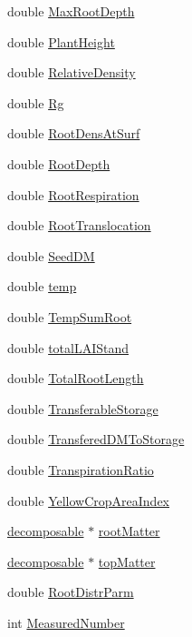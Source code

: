 \begin{DoxyCompactItemize}
double \hyperlink{classcrop_a10ecc3d91cd9e62af94a5b889587d3f4}{MaxRootDepth}
\item 
double \hyperlink{classcrop_a3f40980535ac184d9cced18aff1a0f8c}{PlantHeight}
\item 
double \hyperlink{classcrop_aa4666fdd11920e05003bfeefc5518ddf}{RelativeDensity}
\item 
double \hyperlink{classcrop_a089361fdbd7eedb3b84e501ebc4f7221}{Rg}
\item 
double \hyperlink{classcrop_a512f2450d70fb9f2a84d046d5a090a94}{RootDensAtSurf}
\item 
double \hyperlink{classcrop_aefe9049cee98b6ac81f4362c4a1190a9}{RootDepth}
\item 
double \hyperlink{classcrop_ab27528bd7fd066f3c4e028de1fbc70e1}{RootRespiration}
\item 
double \hyperlink{classcrop_a15b020b5308e854371c7919b1ebe64ab}{RootTranslocation}
\item 
double \hyperlink{classcrop_a2dfb21c27aff36f3049be9a39e7c6538}{SeedDM}
\item 
double \hyperlink{classcrop_abfc8df1469f20d8084f744da461d1df5}{temp}
\item 
double \hyperlink{classcrop_a362d42d586668dca552ec4d8cd381b68}{TempSumRoot}
\item 
double \hyperlink{classcrop_ac25231ecf44f1c5ffb8bf60c45334929}{totalLAIStand}
\item 
double \hyperlink{classcrop_a1f0aa4443cf11cdf5776454bd056fa28}{TotalRootLength}
\item 
double \hyperlink{classcrop_a0c55583d4613cc09bb912de3078aae49}{TransferableStorage}
\item 
double \hyperlink{classcrop_ab1133e34965bc17531d6bbf675cfa240}{TransferedDMToStorage}
\item 
double \hyperlink{classcrop_a461228045f8a07f1f12a06acd12adf89}{TranspirationRatio}
\item 
double \hyperlink{classcrop_a7acb3fa412808c819f4d9b662cc2148c}{YellowCropAreaIndex}
\item 
\hyperlink{classdecomposable}{decomposable} $\ast$ \hyperlink{classcrop_a2ca05aa427979d52b8fbbba1cc5150cf}{rootMatter}
\item 
\hyperlink{classdecomposable}{decomposable} $\ast$ \hyperlink{classcrop_a4a8b0a766947fe8b0dfc6a59a24b9bef}{topMatter}
\item 
double \hyperlink{classcrop_a5c8bcec383225ccfa1997ed7de4b2446}{RootDistrParm}
\item 
int \hyperlink{classcrop_a47dba0ce0c03f35aa973d259f32c7b74}{MeasuredNumber}

\end{DoxyCompactItemize}
